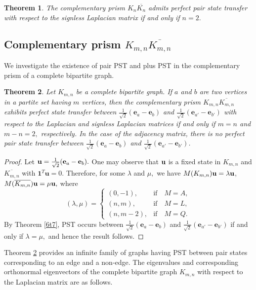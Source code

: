 \documentclass[12pt,a4paper]{article}
\newtheorem{thm}{Theorem}
\def \e {{\bf e}}
\def \u {{\bf u}}
\def \e {{\mathbf e}}
\begin{document}
\begin{thm}
    The complementary prism  $K_n\overline{K_n}$ admits perfect pair state transfer with respect to the signless Laplacian matrix if and only if $n=2.$
 \end{thm}

\subsection{Complementary prism $K_{m,n}\overline{K_{m,n}}$}
 We investigate the existence of pair PST and plus PST in the complementary prism of a complete bipartite graph.
\begin{thm}\label{6t10}
Let $K_{m,n}$ be a complete bipartite graph. If $a$ and $b$ are two vertices in a partite set having $m$ vertices, then the complementary prism $K_{m,n}\overline{K_{m,n}}$ exhibits perfect state transfer between $\frac{1}{\sqrt{2}}(\e_a-\e_b)$ and $\frac{1}{\sqrt{2}}(\e_{a'}-\e_{b'})$ with respect to the Laplacian and signless Laplacian matrices if and only if $m=n$ and $m-n=2,$ respectively. In the case of the adjacency matrix, there is no perfect pair state transfer between $\frac{1}{\sqrt{2}}(\e_a-\e_b)$ and $\frac{1}{\sqrt{2}}(\e_{a'}-\e_{b'})$.
\end{thm}
\begin{proof}
    Let $\u=\frac{1}{\sqrt{2}}(\e_a-\e_b).$ One may observe that $\u$ is a fixed state in $K_{m,n}$ and $\overline {K_{m,n}}$ with
$\mathbf1^T\mathbf u=0.$ Therefore, for some $\lambda$ and $\mu,$ we have 
$M(K_{m,n})\mathbf u=\lambda\u$, $M(\overline{K_{m,n}})\u=\mu\u,$ where
\[
(\lambda,\mu) =
\begin{cases}
(0,-1), & \text{if}\quad M=A,\\
(n,m), & \text{if}\quad M=L,\\
(n,m-2), & \text{if}\quad M=Q.
\end{cases}
\]
By Theorem \ref{6t7}, PST occurs between $\frac{1}{\sqrt{2}}(\e_a-\e_b)$ and $\frac{1}{\sqrt{2}}(\e_{a'}-\e_{b'})$ if and only if $\lambda=\mu,$ and hence the result follows. 
\end{proof}
Theorem \ref{6t10} provides an infinite family of graphs having PST between pair states corresponding to an edge and a non-edge.
The eigenvalues and corresponding orthonormal eigenvectors of the complete bipartite graph $K_{m,n}$ with respect to the Laplacian matrix are as follows.
\end{document}
